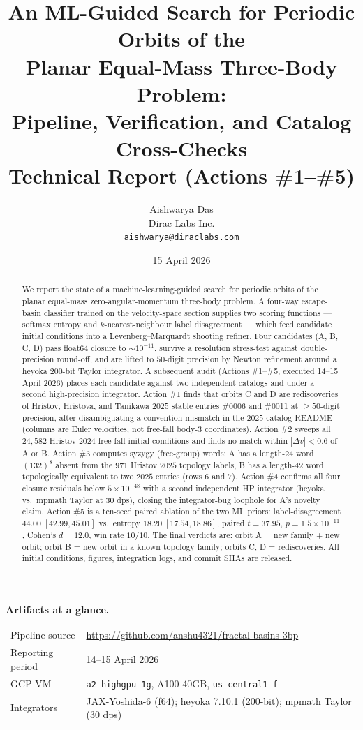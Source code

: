 \documentclass[11pt]{article}
\title{\bfseries\Large
  An ML-Guided Search for Periodic Orbits of the\\
  Planar Equal-Mass Three-Body Problem:\\[0.4em]
  Pipeline, Verification, and Catalog Cross-Checks\\[0.6em]
  \large\normalfont Technical Report (Actions \#1--\#5)}
\author{
  Aishwarya Das\\
  \small Dirac Labs Inc.\\
  \small \texttt{aishwarya@diraclabs.com}
}
\date{15 April 2026}
\begin{document}
\maketitle

\begin{abstract}
We report the state of a machine-learning-guided search for periodic
orbits of the planar equal-mass zero-angular-momentum three-body
problem. A four-way escape-basin classifier trained on the
velocity-space section supplies two scoring functions --- softmax entropy
and $k$-nearest-neighbour label disagreement --- which feed candidate
initial conditions into a Levenberg--Marquardt shooting refiner.
Four candidates (A, B, C, D) pass float64 closure to $\sim\!10^{-11}$,
survive a resolution stress-test against double-precision round-off,
and are lifted to $50$-digit precision by Newton refinement around a
heyoka \citep{heyoka} $200$-bit Taylor integrator. A subsequent
audit (Actions \#1--\#5, executed 14--15 April 2026) places each
candidate against two independent catalogs and under a second
high-precision integrator. Action \#1 finds that orbits C and D are
rediscoveries of Hristov, Hristova, and Tanikawa $2025$ stable entries
\#0006 and \#0011 at $\ge\!50$-digit precision, after disambiguating a
convention-mismatch in the $2025$ catalog README (columns are Euler
velocities, not free-fall body-3 coordinates). Action \#2 sweeps all
$24{,}582$ Hristov $2024$ free-fall initial conditions and finds no
match within $|\Delta v| < 0.6$ of A or B. Action \#3 computes syzygy
(free-group) words: A has a length-$24$ word $(132)^8$ absent from the
$971$ Hristov $2025$ topology labels, B has a length-$42$ word
topologically equivalent to two $2025$ entries (rows $6$ and $7$).
Action \#4 confirms all four closure residuals below $5\times 10^{-48}$
with a second independent HP integrator (heyoka vs.\ mpmath Taylor at
$30$ dps), closing the integrator-bug loophole for A's novelty claim.
Action \#5 is a ten-seed paired ablation of the two ML priors:
label-disagreement $44.00\;[42.99,45.01]$ vs.\ entropy
$18.20\;[17.54,18.86]$, paired $t = 37.95$, $p=1.5\!\times\!10^{-11}$,
Cohen's $d = 12.0$, win rate $10/10$. The final verdicts are: orbit A
= new family + new orbit; orbit B = new orbit in a known topology
family; orbits C, D = rediscoveries. All initial conditions, figures,
integration logs, and commit SHAs are released.
\end{abstract}

\vspace{0.4em}
\noindent\textbf{Artifacts at a glance.}
\begin{center}\small
\begin{tabular}{@{}ll@{}}
Pipeline source & \url{https://github.com/anshu4321/fractal-basins-3bp}\\
Reporting period & 14--15 April 2026 \\
GCP VM & \texttt{a2-highgpu-1g}, A100 40GB, \texttt{us-central1-f}\\
Integrators & JAX-Yoshida-6 (f64); heyoka 7.10.1 (200-bit); mpmath Taylor (30 dps) \\
\end{tabular}
\end{center}
\end{document}
